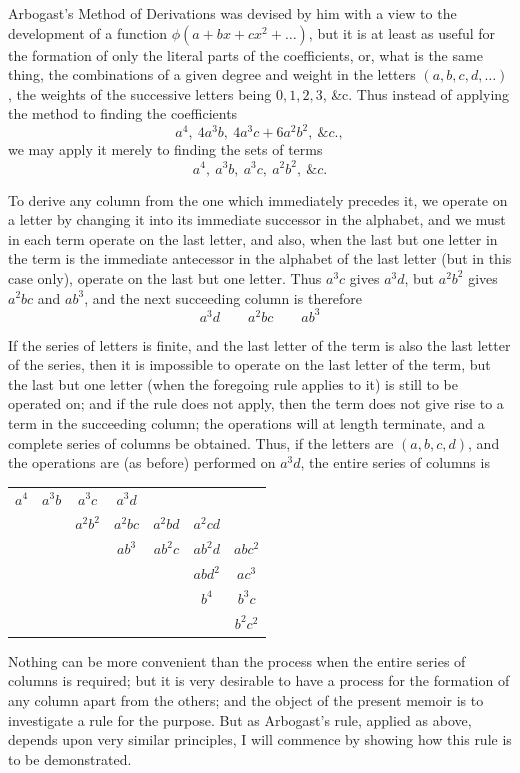 \documentclass[11pt,a4paper]{article}
\theoremstyle{definition}
\begin{document}
Arbogast's Method of Derivations was devised by him with a view to the development of a function $\phi(a+bx+cx^2+\ldots)$, but it is at least as useful for the formation of only the literal parts of the coefficients, or, what is the same thing, the combinations of a given degree and weight in the letters $(a,b,c,d,\ldots)$, the weights of the successive letters being $0,1,2,3$, \&c. Thus instead of applying the method to finding the coefficients
\[
a^4,\ 4a^3b,\ 4a^3c+6a^2b^2,\ \&c.,
\]
we may apply it merely to finding the sets of terms
\[
a^4,\ a^3b,\ a^3c,\ a^2b^2,\ \&c.
\]

To derive any column from the one which immediately precedes it, we operate on a letter by changing it into its immediate successor in the alphabet, and we must in each term operate on the last letter, and also, when the last but one letter in the term is the immediate antecessor in the alphabet of the last letter (but in this case only), operate on the last but one letter. Thus $a^3c$ gives $a^3d$, but $a^2b^2$ gives $a^2bc$ and $ab^3$, and the next succeeding column is therefore
\[
a^3d\qquad a^2bc\qquad ab^3
\]

If the series of letters is finite, and the last letter of the term is also the last letter of the series, then it is impossible to operate on the last letter of the term, but the last but one letter (when the foregoing rule applies to it) is still to be operated on; and if the rule does not apply, then the term does not give rise to a term in the succeeding column; the operations will at length terminate, and a complete series of columns be obtained. Thus, if the letters are $(a,b,c,d)$, and the operations are (as before) performed on $a^3d$, the entire series of columns is
\begin{center}
\begin{tabular}{ccccccc}
$a^4$ & $a^3b$ & $a^3c$ & $a^3d$ & & & \\
 & & $a^2b^2$ & $a^2bc$ & $a^2bd$ & $a^2cd$ & \\
 & & & $ab^3$ & $ab^2c$ & $ab^2d$ & $abc^2$ \\
 & & & & & $abd^2$ & $ac^3$ \\
 & & & & & $b^4$ & $b^3c$ \\
 & & & & & & $b^2c^2$ \\
\end{tabular}
\end{center}

Nothing can be more convenient than the process when the entire series of columns is required; but it is very desirable to have a process for the formation of any column apart from the others; and the object of the present memoir is to investigate a rule for the purpose. But as Arbogast's rule, applied as above, depends upon very similar principles, I will commence by showing how this rule is to be demonstrated.
\end{document}
